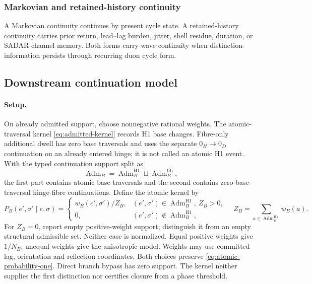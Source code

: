 \subsubsection{Markovian and retained-history continuity}
\label{subsec:duon-continuity}
A Markovian continuity continues by present cycle state. A retained-history continuity carries prior return, lead--lag burden, jitter, shell residue, duration, or SADAR channel memory. Both forms carry wave continuity when distinction-information persists through recurring duon cycle form.


\subsection{Downstream continuation model}
\label{subsec:q4-hamming-ternary-kernel}
\label{subsec:hinge-slide}
\paragraph{Setup.}
On already admitted support, choose nonnegative rational weights. The atomic-traversal kernel \eqref{eq:admitted-kernel} records H1 base changes. Fibre-only additional dwell has zero base traversals and uses the separate \(0_H\to0_D\) continuation on an already entered hinge; it is not called an atomic H1 event. With
the typed continuation support split as
\begin{equation}
\operatorname{Adm}_B=
\operatorname{Adm}^{\mathrm{H1}}_B\sqcup\operatorname{Adm}^{\mathrm{fib}}_B,
\label{eq:continuation-domain-split}
\end{equation}
the first part contains atomic base traversals and the second contains
zero-base-traversal hinge-fibre continuations. Define the atomic kernel by
\begin{equation}
P_B(e',\sigma'\mid e,\sigma)=
\begin{cases}
w_B(e',\sigma')/Z_B,&(e',\sigma')\in\operatorname{Adm}^{\mathrm{H1}}_B,\ Z_B>0,\\
0,&(e',\sigma')\notin\operatorname{Adm}^{\mathrm{H1}}_B,
\end{cases}
\quad Z_B=\sum_{a\in\operatorname{Adm}^{\mathrm{H1}}_B}w_B(a).
\label{eq:admitted-kernel}
\end{equation}
For \(Z_B=0\), report empty positive-weight support; distinguish it from an empty structural admissible set. Neither case is normalized. Equal
positive weights give \(1/N_B\); unequal weights give the anisotropic model.
Weights may use committed lag, orientation and reflection coordinates.
Both choices preserve \eqref{eq:atomic-probability-one}. Direct branch bypass
has zero support. The kernel neither supplies the first distinction nor
certifies closure from a phase threshold.

